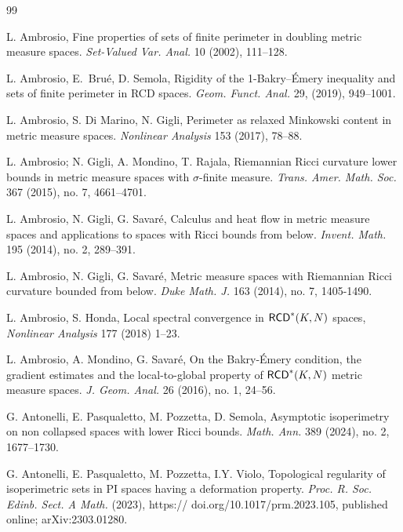 \documentclass[11pt, reqno]{amsart}
\numberwithin{equation}{section}
\begin{document}
	
	
	\begin{thebibliography}{99}
		
		 L. Ambrosio, Fine properties of sets of finite perimeter in doubling metric measure
		spaces. \textit{Set-Valued Var. Anal.} 10 (2002),  111--128.
		
		 L. Ambrosio, E.\ Bru\'e, D. Semola, Rigidity of the 1-Bakry–\'Emery inequality and sets of finite perimeter in RCD spaces. \textit{Geom. Funct. Anal.} 29, (2019), 949--1001. 
		
		 L. Ambrosio, S. Di Marino, N. Gigli, Perimeter as relaxed Minkowski content in metric measure spaces. \textit{Nonlinear
			Analysis} 153 (2017),  78--88.
		
		L. Ambrosio; N. Gigli, A. Mondino, T. Rajala,
		Riemannian Ricci curvature lower bounds in metric measure spaces with $\sigma$-finite measure.
		\textit{Trans. Amer. Math. Soc.}  367 (2015), no. 7, 4661--4701.
		
		
		 L. Ambrosio, N. Gigli, G. Savar\'e, Calculus and heat flow in metric measure spaces and applications to spaces
		with Ricci bounds from below. \textit{Invent. Math.} 195 (2014), no. 2, 289--391.
		
		 L. Ambrosio, N. Gigli, G. Savar\'e, Metric measure spaces with Riemannian Ricci curvature bounded from below.  \textit{Duke Math. J.} 163 (2014), no. 7, 1405-1490.
		
		 L. Ambrosio, S. Honda, Local spectral convergence in ${\sf RCD}^{*}(K,N)$ spaces, \textit{Nonlinear Analysis} 177 (2018) 1--23.
		
		 L. Ambrosio, A. Mondino, G. Savaré,  On the Bakry-Émery condition, the gradient estimates and the local-to-global property of ${\sf RCD}^*(K,N)$ metric measure spaces. \textit{J. Geom. Anal.} 26 (2016), no. 1, 24--56.
		
		 G. Antonelli, E. Pasqualetto,  M. Pozzetta, D. Semola, Asymptotic isoperimetry on non collapsed spaces with lower Ricci bounds.\textit{ Math. Ann.} 389 (2024), no. 2, 1677--1730.
		
		 G. Antonelli, E. Pasqualetto, M. Pozzetta, I.Y. Violo, Topological regularity of isoperimetric sets
		in PI spaces having a deformation property. \textit{Proc. R. Soc. Edinb. Sect. A Math.} (2023), https://
		doi.org/10.1017/prm.2023.105, published online; arXiv:2303.01280.
		

\end{thebibliography}
\end{document}
